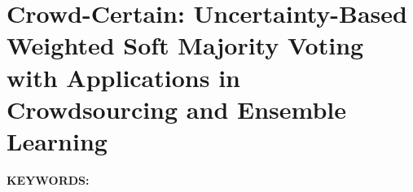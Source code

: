 \renewcommand{\chapterpath}[1]{Chapters/crowd/#1}
\renewcommand{\figurepath}[1]{Chapters/crowd/figures/#1}
% 

\chapter{Crowd-Certain: Uncertainty-Based Weighted Soft Majority Voting with Applications in Crowdsourcing and Ensemble Learning}\label{ch:crowd}

%
\textbf{KEYWORDS:\ } %

\newpage


